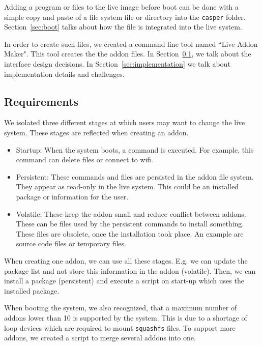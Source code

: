 \documentclass[english]{lni}
\begin{document}
Adding a program or files to the live image before boot can be done with a simple copy and paste of a file system file or directory into the \texttt{casper} folder.
Section~\ref{sec:boot} talks about how the file is integrated into the live system.

In order to create such files, we created a command line tool named ``Live Addon Maker".
This tool creates the the addon files.
In Section~\ref{sec:requirements}, we talk about the interface design decisions.
In Section~\ref{sec:implementation} we talk about implementation details and challenges.

\subsection{Requirements}
\label{sec:requirements}

We isolated three different stages at which users may want to change the live system.
These stages are reflected when creating an addon.

\begin{itemize}
  \item Startup:
        When the system boots, a command is executed.
        For example, this command can delete files or connect to wifi.
  \item Persistent:
        These commands and files are persisted in the addon file system.
        They appear as read-only in the live system.
        This could be an installed package or information for the user.
  \item Volatile:
        These keep the addon small and reduce conflict between addons.
        These can be files used by the persistent commands to install something.
        These files are obsolete, once the installation took place.
        An example are source code files or temporary files.
\end{itemize}

When creating one addon, we can use all these stages.
E.g. we can update the package list and not store this information in the addon (volatile). Then, we can install a package (persistent) and execute a script on start-up which uses the installed package.

When booting the system, we also recognized, that a maximum number of addons lower than 10 is supported by the system.
This is due to a shortage of loop devices which are required to mount \texttt{squashfs} files.
To support more addons, we created a script to merge several addons into one.
\end{document}
